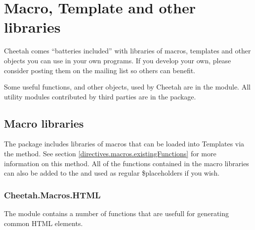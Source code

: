 \section{Macro, Template and other libraries}
\label{libraries}

Cheetah comes ``batteries included'' with libraries of macros, templates and
other objects you can use in your own programs. If you develop your own, please
consider posting them on the mailing list so others can benefit. 

Some useful functions, and other objects, used by Cheetah are in the
 module.  All utility modules contributed by third
parties are in the  package.

\subsection{Macro libraries}
\label{libraries.macros}

The package  includes libraries of macros that can be
loaded into Templates via the  method.
See section \ref{directives.macros.existingFunctions} for more information on
this method.  All of the functions contained in the macro libraries can also be
added to the  and used as regular \$placeholders if you wish.

\subsubsection{Cheetah.Macros.HTML}
\label{libraries.macros.HTML}
The module  contains a number of functions that are
usefull for generating common HTML elements.

